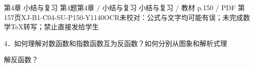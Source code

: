 \begin{bankitem}{第4章 小结与复习 第4题}{第4章 / 小结与复习 小结与复习 / 教材 p.150 / PDF 第157页}{XJ-B1-C04-SU-P150-Y1140}{OCR未校对：公式与文字均可能有误；未完成数学TeX转写；禁止直接发给学生}
\begin{ocrdraft}
\par
4．如何理解对数函数和指数函数互为反函数？如何分别从图象和解析式理
\par
解反函数？
\end{ocrdraft}
\end{bankitem}

